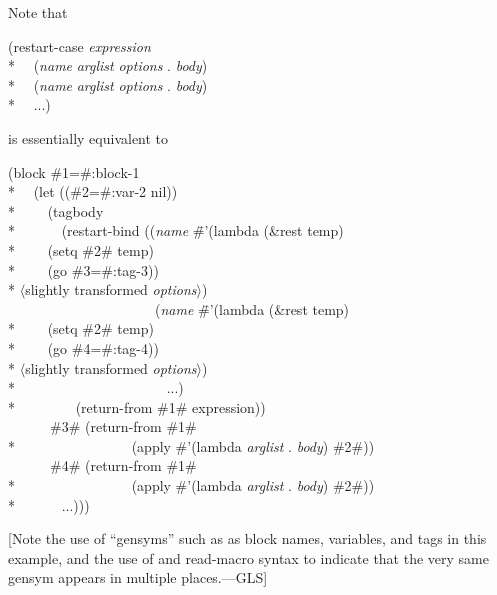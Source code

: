 \begin{defmac}
\begin{flushdesc}
\end{flushdesc}

Note that 
\begin{lisp}
(restart-case \emph{expression} \\*
~~(\emph{name} \emph{arglist} \emph{options} . \emph{body}) \\*
~~(\emph{name} \emph{arglist} \emph{options} . \emph{body}) \\*
~~...)
\end{lisp}
is essentially equivalent to
\begin{lisp}
(block \#1=\#:block-1 \\*
~~(let ((\#2=\#:var-2 nil)) \\*
~~~~(tagbody \\*
~~~~~~(restart-bind ((\emph{name} \=\#'(lambda (\&rest temp) \\*
\>~~~~(setq \#2\# temp) \\*
\>~~~~(go \#3=\#:tag-3)) \\*
\>\textrm{$\langle$slightly transformed \emph{options}$\rangle$}) \\
~~~~~~~~~~~~~~~~~~~~~(\emph{name} \=\#'(lambda (\&rest temp) \\*
\>~~~~(setq \#2\# temp) \\*
\>~~~~(go \#4=\#:tag-4)) \\*
\>\textrm{$\langle$slightly transformed \emph{options}$\rangle$}) \\*
~~~~~~~~~~~~~~~~~~~~~...) \\*
~~~~~~~~(return-from \#1\# expression)) \\
~~~~~~\#3\# (return-from \#1\# \\*
~~~~~~~~~~~~~~~~(apply \#'(lambda \emph{arglist} . \emph{body}) \#2\#)) \\
~~~~~~\#4\# (return-from \#1\# \\*
~~~~~~~~~~~~~~~~(apply \#'(lambda \emph{arglist} . \emph{body}) \#2\#)) \\*
~~~~~~...)))
\end{lisp}
[Note the use of ``gensyms'' such as  as block names,
variables, and  tags in this example,
and the use of  and  read-macro syntax
to indicate that the very same gensym appears in multiple places.---GLS]



\end{defmac}
